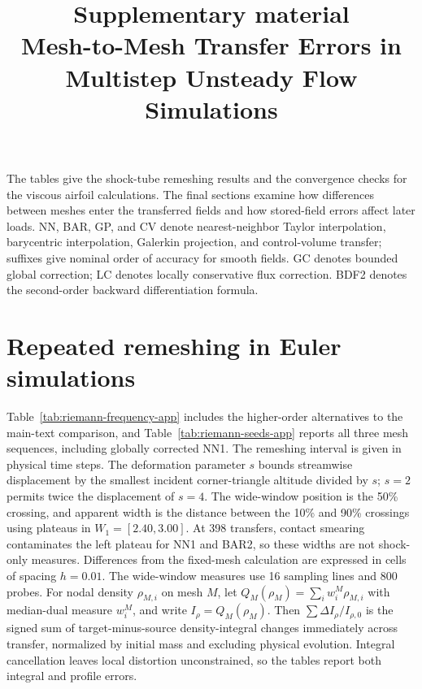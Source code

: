 \documentclass[11pt,a4paper]{article}
\title{Supplementary material\\[0.4em]\large Mesh-to-Mesh Transfer Errors in Multistep Unsteady Flow Simulations}
\author{}
\date{}
\begin{document}
\maketitle
The tables give the shock-tube remeshing results and the convergence checks for the viscous airfoil calculations. The final sections examine how differences between meshes enter the transferred fields and how stored-field errors affect later loads. NN, BAR, GP, and CV denote nearest-neighbor Taylor interpolation, barycentric interpolation, Galerkin projection, and control-volume transfer; suffixes give nominal order of accuracy for smooth fields. GC denotes bounded global correction; LC denotes locally conservative flux correction. BDF2 denotes the second-order backward differentiation formula.

\section{Repeated remeshing in Euler simulations}
\label{supp:euler}

Table~\ref{tab:riemann-frequency-app} includes the higher-order alternatives to the main-text comparison, and Table~\ref{tab:riemann-seeds-app} reports all three mesh sequences, including globally corrected NN1. The remeshing interval is given in physical time steps. The deformation parameter $s$ bounds streamwise displacement by the smallest incident corner-triangle altitude divided by $s$; $s=2$ permits twice the displacement of $s=4$. The wide-window position is the 50\% crossing, and apparent width is the distance between the 10\% and 90\% crossings using plateaus in $W_1=[2.40,3.00]$. At 398 transfers, contact smearing contaminates the left plateau for NN1 and BAR2, so these widths are not shock-only measures. Differences from the fixed-mesh calculation are expressed in cells of spacing $h=0.01$. The wide-window measures use 16 sampling lines and 800 probes. For nodal density $\rho_{M,i}$ on mesh $M$, let $Q_M(\rho_M)=\sum_i w_i^M\rho_{M,i}$ with median-dual measure $w_i^M$, and write $I_\rho=Q_M(\rho_M)$. Then $\sum\Delta I_\rho/I_{\rho,0}$ is the signed sum of target-minus-source density-integral changes immediately across transfer, normalized by initial mass and excluding physical evolution. Integral cancellation leaves local distortion unconstrained, so the tables report both integral and profile errors.
\end{document}
